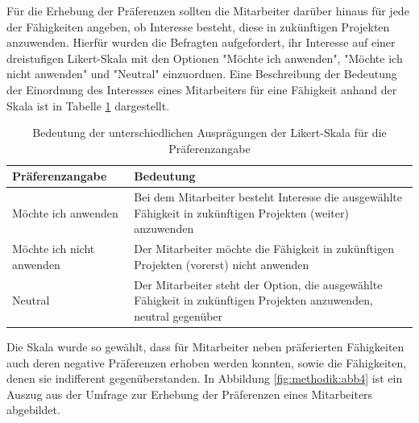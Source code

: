 Für die Erhebung der Präferenzen sollten die Mitarbeiter darüber hinaus für jede der Fähigkeiten angeben, ob Interesse besteht, diese in zukünftigen Projekten anzuwenden.
Hierfür wurden die Befragten aufgefordert, ihr Interesse auf einer dreistufigen Likert-Skala mit den Optionen "Möchte ich anwenden", "Möchte ich nicht anwenden" und "Neutral" einzuordnen.
Eine Beschreibung der Bedeutung der Einordnung des Interesses eines Mitarbeiters für eine Fähigkeit anhand der Skala ist in Tabelle \ref{tab:methodik:tab2} dargestellt.

\begin{table}[htbp]
    \begin{center}
    \begin{tabular}{p{1.5in}|p{3.25in}}
    {\textbf{Präferenzangabe}} & {\textbf{Bedeutung}}\\
    \hline
	Möchte ich anwenden & Bei dem Mitarbeiter besteht Interesse die ausgewählte Fähigkeit in zukünftigen Projekten (weiter) anzuwenden \\
    \hline
    Möchte ich nicht anwenden & Der Mitarbeiter möchte die Fähigkeit in zukünftigen Projekten (vorerst) nicht anwenden \\
    \hline
    Neutral & Der Mitarbeiter steht der Option, die ausgewählte Fähigkeit in zukünftigen Projekten anzuwenden, neutral gegenüber \\
    \end{tabular}
    \end{center}
    \caption[Bedeutung der unterschiedlichen Ausprägungen der Likert-Skala für die Präferenzangabe]{Bedeutung der unterschiedlichen Ausprägungen der Likert-Skala für die Präferenzangabe}
	\label{tab:methodik:tab2}
\end{table}

Die Skala wurde so gewählt, dass für Mitarbeiter neben präferierten Fähigkeiten auch deren negative Präferenzen erhoben werden konnten, sowie die Fähigkeiten, denen sie indifferent gegenüberstanden.
In Abbildung \ref{fig:methodik:abb4} ist ein Auszug aus der Umfrage zur Erhebung der Präferenzen eines Mitarbeiters abgebildet.

